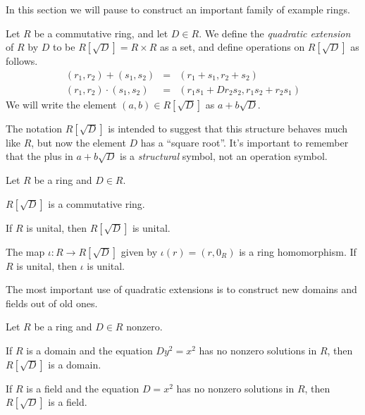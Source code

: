 In this section we will pause to construct an important family of example rings.

\begin{dfn}
Let \(R\) be a commutative ring, and let \(D \in R\).
We define the \emph{quadratic extension} of \(R\) by \(D\) to be \(R[\sqrt{D}] = R \times R\) as a set, and define operations on \(R[\sqrt{D}]\) as follows.
\begin{eqnarray*}
(r_1,r_2) + (s_1,s_2) & = & (r_1+s_1, r_2+s_2) \\
(r_1,r_2) \cdot (s_1,s_2) & = & (r_1s_1 + Dr_2s_2, r_1s_2 + r_2s_1)
\end{eqnarray*}
We will write the element \((a,b) \in R[\sqrt{D}]\) as \(a + b\sqrt{D}\).
\end{dfn}

The notation \(R[\sqrt{D}]\) is intended to suggest that this structure behaves much like \(R\), but now the element \(D\) has a ``square root''.
It's important to remember that the plus in \(a + b\sqrt{D}\) is a \emph{structural} symbol, not an operation symbol.

\begin{prop} \label{prop:quad-ext-ring}
Let \(R\) be a ring and \(D \in R\).
\begin{proplist*}
\item \(R[\sqrt{D}]\) is a commutative ring.
\item If \(R\) is unital, then \(R[\sqrt{D}]\) is unital.
\item The map \(\iota : R \rightarrow R[\sqrt{D}]\) given by \(\iota(r) = (r,0_R)\) is a ring homomorphism.
If \(R\) is unital, then \(\iota\) is unital.
\end{proplist*}
\end{prop}

The most important use of quadratic extensions is to construct new domains and fields out of old ones.

\begin{prop} \label{prop:quad-ext-dom}
Let \(R\) be a ring and \(D \in R\) nonzero.
\begin{proplist}
\item If \(R\) is a domain and the equation \(Dy^2 = x^2\) has no nonzero solutions in \(R\), then \(R[\sqrt{D}]\) is a domain.
\item If \(R\) is a field and the equation \(D = x^2\) has no nonzero solutions in \(R\), then \(R[\sqrt{D}]\) is a field.
\end{proplist}
\end{prop}

